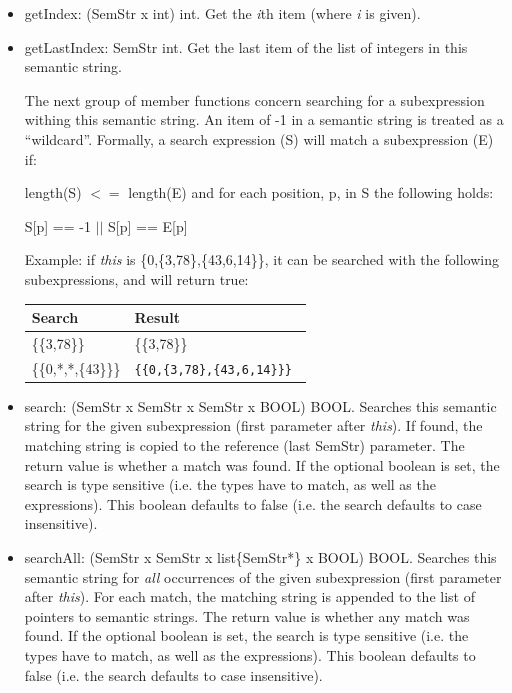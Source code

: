 \begin{itemize}
\item   getIndex: (SemStr x int) \ra int.
    Get the {\it i}th item (where {\it i} is given).

\item   getLastIndex: SemStr \ra int.
    Get the last item of the list of integers in this semantic string.

    The next group of member functions concern searching for a subexpression
    withing this semantic string. An item of -1 in a semantic string is treated
    as a ``wildcard''.
    Formally, a search expression (S) will match a subexpression (E) if:

    length(S) $<=$ length(E) and for each position, p, in S the following holds:

    S[p] == -1 $||$ S[p] == E[p]

    Example: if {\it this} is \{0,\{3,78\},\{43,6,14\}\},
    it can be searched with the following subexpressions, and will return true:

\begin{tabular}{|l|l|} \hline
    Search & Result \\
\hline
    \{\{3,78\}\} & \{\{3,78\}\} \\
    \{\{0,*,*,\{43\}\}\} & \tt\{\{0,\{3,78\},\{43,6,14\}\}\} \\
\hline
\end{tabular}

\item   search: (SemStr x SemStr x SemStr x BOOL) \ra BOOL.
    Searches this semantic string for the given subexpression (first parameter
    after {\it this}). If found, the matching string is copied to the reference
    (last SemStr) parameter. The return value is whether a match was found.
    If the optional boolean is set, the search is type
    sensitive (i.e. the types have to match, as well as the expressions). This
    boolean defaults to false (i.e. the search defaults to case insensitive).

\item   searchAll: (SemStr x SemStr x list\{SemStr*\} x BOOL) \ra BOOL.
    Searches this semantic string for {\it all} occurrences of the given
    subexpression (first parameter after {\it this}). For each match, the
    matching string is appended to the list of pointers to semantic strings.
    The return value is whether any match was found.
    If the optional boolean is set, the search is type
    sensitive (i.e. the types have to match, as well as the expressions). This
    boolean defaults to false (i.e. the search defaults to case insensitive).


\end{itemize}
